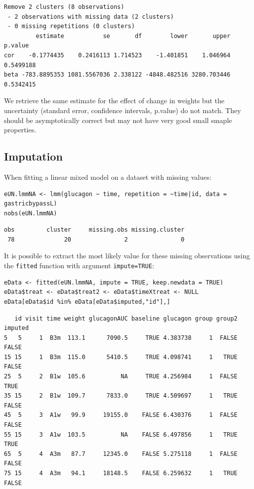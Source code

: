 \documentclass[12pt]{article}
\begin{document}
\begin{verbatim}
Remove 2 clusters (8 observations) 
 - 2 observations with missing data (2 clusters) 
 - 0 missing repetitions (0 clusters)
         estimate           se       df        lower       upper   p.value
cor    -0.1774435    0.2416113 1.714523    -1.401851    1.046964 0.5499188
beta -783.8895353 1081.5567036 2.338122 -4848.482516 3280.703446 0.5342415
\end{verbatim}



We retrieve the same estimate for the effect of change in weights but
the uncertainty (standard error, confidence intervals, p.value) do not
match. They should be asymptotically correct but may not have very
good small smaple properties.

\subsection{Imputation}
\label{imputation}
When fitting a linear mixed model on a dataset with missing values:
\lstset{language=r,label= ,caption= ,captionpos=b,numbers=none}
\begin{lstlisting}
eUN.lmmNA <- lmm(glucagon ~ time, repetition = ~time|id, data = gastricbypassL)
nobs(eUN.lmmNA)
\end{lstlisting}

\begin{verbatim}
obs         cluster     missing.obs missing.cluster 
 78              20               2               0
\end{verbatim}


It is possible to extract the most likely value for these missing
observations using the \texttt{fitted} function with argument \texttt{impute=TRUE}:
\lstset{language=r,label= ,caption= ,captionpos=b,numbers=none}
\begin{lstlisting}
eData <- fitted(eUN.lmmNA, impute = TRUE, keep.newdata = TRUE)
eData$treat <- eData$treat2 <- eData$timeXtreat <- NULL
eData[eData$id %in% eData[eData$imputed,"id"],]
\end{lstlisting}

\begin{verbatim}
   id visit time weight glucagonAUC baseline glucagon group group2 imputed
5   5     1  B3m  113.1      7090.5     TRUE 4.383738     1  FALSE   FALSE
15 15     1  B3m  115.0      5410.5     TRUE 4.098741     1   TRUE   FALSE
25  5     2  B1w  105.6          NA     TRUE 4.256984     1  FALSE    TRUE
35 15     2  B1w  109.7      7833.0     TRUE 4.509697     1   TRUE   FALSE
45  5     3  A1w   99.9     19155.0    FALSE 6.430376     1  FALSE   FALSE
55 15     3  A1w  103.5          NA    FALSE 6.497856     1   TRUE    TRUE
65  5     4  A3m   87.7     12345.0    FALSE 5.275118     1  FALSE   FALSE
75 15     4  A3m   94.1     18148.5    FALSE 6.259632     1   TRUE   FALSE
\end{verbatim}
\end{document}
